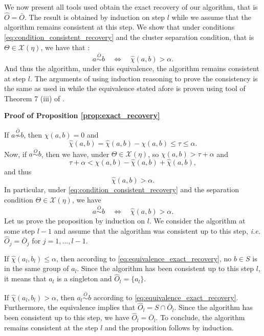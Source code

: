 \documentclass[11pt]{article}
\makeatletter
\theoremstyle{definition}
\renewenvironment{proof}[1][\proofname]{\par
\pushQED{\qed}%
\normalfont \topsep6\p@\@plus6\p@\relax
\trivlist
\item\relax
{\textbf{
#1\@addpunct{ }}}\hspace\labelsep\ignorespaces
}{%
\popQED\endtrivlist\@endpefalse
}
\makeatother
\begin{document}
	We now present all tools used obtain the exact recovery of our algorithm, that is $\hat{O} = \bar{O}$. The result is obtained by induction on step $l$ while we assume that the algorithm remains consistent at this step. We show that under conditions \eqref{eq:condition_consistent_recovery} and the cluster separation condition, that is $\Theta \in \mathcal{X}(\eta)$, we have that :
	\begin{equation*}
		a \overset{\bar{O}}{ \sim } b \quad \Longleftrightarrow \quad \hat{\chi}(a, b) > \alpha.
	\end{equation*}
	And thus the algorithm, under this equivalence, the algorithm remains consistent at step $l$. The arguments of using induction reasoning to prove the consistency is the same as used in \cite{10.1214/18-AOS1794} while the equivalence stated afore is proven using tool of Theorem 7 (iii) of \cite{tsybakov2014aggregation}.
	
	\begin{proof}[Proof of Proposition \ref{prop:exact_recovery}]
		If $a \overset{\bar{O}}{\not \sim} b$, then $\chi(a,b) = 0$ and 
		\begin{equation*}
			\hat{\chi}(a,b) = \hat{\chi}(a,b) - \chi(a,b) \leq \tau \leq \alpha.
		\end{equation*}
		Now, if $a \overset{\bar{O}}{\sim} b$, then we have, under $\Theta \in \mathcal{X}(\eta)$, so $\chi(a,b) > \tau + \alpha$ and 
		\begin{equation*}
			\tau + \alpha < \chi(a,b) - \hat{\chi}(a,b) + \hat{\chi}(a,b),
		\end{equation*}
		and thus
		\begin{equation*}
			\hat{\chi}(a,b) > \alpha.
		\end{equation*}
		In particular, under \eqref{eq:condition_consistent_recovery} and the separation condition $\Theta \in \mathcal{X}(\eta)$, we have 
		\begin{equation}
			\label{eq:equivalence_exact_recovery}
		a \overset{\bar{O}}{ \sim } b \quad \Longleftrightarrow \quad \hat{\chi}(a, b) > \alpha.
		\end{equation}
		Let us prove the proposition by induction on $l$. We consider the algorithm at some step $l-1$ and assume that the algorithm was consistent up to this step, \emph{i.e.} $\hat{O}_j = \bar{O}_j$ for $j = 1,\dots,l-1$.
		
		If $\hat{\chi}(a_l,b_l) \leq \alpha$, then according to \eqref{eq:equivalence_exact_recovery}, no $b \in S$ is in the same group of $a_l$. Since the algorithm has been consistent up to this step $l$, it means that $a_l$ is a singleton and $\hat{O}_l = \{a_l\}$.
		
		If $\hat{\chi}(a_l,b_l) > \alpha$, then $a_l \overset{\bar{O}}{\sim} b$ according to \eqref{eq:equivalence_exact_recovery}. Furthermore, the equivalence implies that $\hat{O}_l = S \cap \bar{O}_l$. Since the algorithm has been consistent up to this step, we have $\hat{O}_l = \bar{O}_l$. To conclude, the algorithm remains consistent at the step $l$ and the proposition follows by induction.
		
	\end{proof}
	
\end{document}
